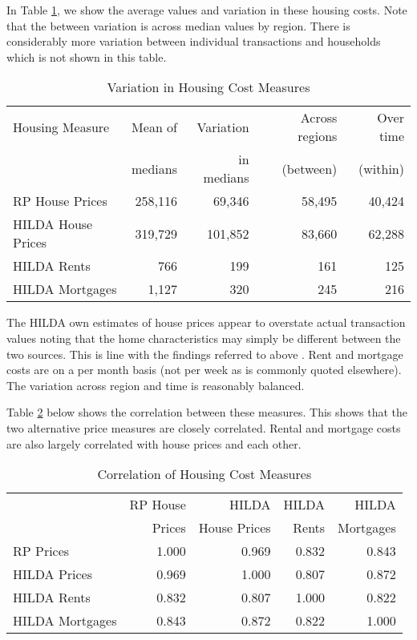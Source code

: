 \documentclass[12pt]{article}
\begin{document}
In Table \ref{houseVar}, we show the average values and variation in these housing costs. Note that the between variation is across median values by region. There is considerably more variation between individual transactions and households which is not shown in this table.

\begin{table}[htpb]
\centering
\caption{Variation in Housing Cost Measures}
\label{houseVar}
\begin{tabular}{lrrrr}
\toprule
Housing Measure & Mean of & Variation & Across regions & Over time\tabularnewline
 & medians & in medians & (between) & (within)\tabularnewline
\midrule
  RP House Prices & 258,116 & 69,346 & 58,495 & 40,424 \\
  HILDA House Prices & 319,729 & 101,852 & 83,660 & 62,288 \\
  HILDA Rents & 766 & 199 & 161 & 125 \\
  HILDA Mortgages & 1,127 & 320 & 245 & 216 \\
\bottomrule
\end{tabular}
\end{table}

The HILDA own estimates of house prices appear to overstate actual transaction values noting that the home characteristics may simply be different between the two sources. This is line with the findings referred to above \parencite{henriques2013perceptions}. Rent and mortgage costs are on a per month basis (not per week as is commonly quoted elsewhere). The variation across region and time is reasonably balanced.

Table \ref{houseCor} below shows the correlation between these measures. This shows that the two alternative price measures are closely correlated. Rental and mortgage costs are also largely correlated with house prices and each other.

\begin{table}[htpb] \centering
  \caption{Correlation of Housing Cost Measures}
  \label{houseCor}
\begin{tabular}{@{}lrrrr@{}}
\toprule
 & RP House & HILDA & HILDA & HILDA \tabularnewline
 & Prices & House Prices & Rents & Mortgages \tabularnewline
\midrule
RP Prices & 1.000 & 0.969 & 0.832 & 0.843 \\
  HILDA Prices & 0.969 & 1.000 & 0.807 & 0.872 \\
  HILDA Rents & 0.832 & 0.807 & 1.000 & 0.822 \\
  HILDA Mortgages & 0.843 & 0.872 & 0.822 & 1.000 \\
\bottomrule
\end{tabular}
\end{table}
\end{document}
